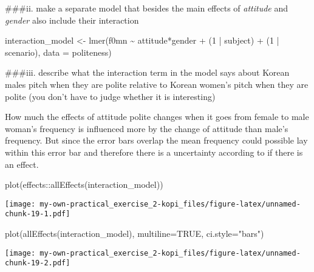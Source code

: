 \documentclass[
]{article}
\newenvironment{Shaded}{\begin{snugshade}}{\end{snugshade}}
\newcommand{\AttributeTok}[1]{\textcolor[rgb]{0.77,0.63,0.00}{#1}}
\newcommand{\ConstantTok}[1]{\textcolor[rgb]{0.00,0.00,0.00}{#1}}
\newcommand{\DecValTok}[1]{\textcolor[rgb]{0.00,0.00,0.81}{#1}}
\newcommand{\FunctionTok}[1]{\textcolor[rgb]{0.00,0.00,0.00}{#1}}
\newcommand{\NormalTok}[1]{#1}
\newcommand{\OtherTok}[1]{\textcolor[rgb]{0.56,0.35,0.01}{#1}}
\newcommand{\SpecialCharTok}[1]{\textcolor[rgb]{0.00,0.00,0.00}{#1}}
\newcommand{\StringTok}[1]{\textcolor[rgb]{0.31,0.60,0.02}{#1}}
\begin{document}
\#\#\#ii. make a separate model that besides the main effects of
\emph{attitude} and \emph{gender} also include their interaction

\begin{Shaded}
\begin{Highlighting}[]
\NormalTok{interaction\_model }\OtherTok{\textless{}{-}} \FunctionTok{lmer}\NormalTok{(f0mn }\SpecialCharTok{\textasciitilde{}}\NormalTok{ attitude}\SpecialCharTok{*}\NormalTok{gender }\SpecialCharTok{+}\NormalTok{ (}\DecValTok{1} \SpecialCharTok{|}\NormalTok{ subject) }\SpecialCharTok{+}\NormalTok{ (}\DecValTok{1} \SpecialCharTok{|}\NormalTok{ scenario), }\AttributeTok{data =}\NormalTok{ politeness)}
\end{Highlighting}
\end{Shaded}

\#\#\#iii. describe what the interaction term in the model says about
Korean males pitch when they are polite relative to Korean women's pitch
when they are polite (you don't have to judge whether it is interesting)

How much the effects of attitude polite changes when it goes from female
to male woman's frequency is influenced more by the change of attitude
than male's frequency. But since the error bars overlap the mean
frequency could possible lay within this error bar and therefore there
is a uncertainty according to if there is an effect.

\begin{Shaded}
\begin{Highlighting}[]
\FunctionTok{plot}\NormalTok{(effects}\SpecialCharTok{::}\FunctionTok{allEffects}\NormalTok{(interaction\_model))}
\end{Highlighting}
\end{Shaded}

\texttt{[image: my-own-practical\_exercise\_2-kopi\_files/figure-latex/unnamed-chunk-19-1.pdf]}

\begin{Shaded}
\begin{Highlighting}[]
\FunctionTok{plot}\NormalTok{(}\FunctionTok{allEffects}\NormalTok{(interaction\_model), }\AttributeTok{multiline=}\ConstantTok{TRUE}\NormalTok{, }\AttributeTok{ci.style=}\StringTok{"bars"}\NormalTok{)}
\end{Highlighting}
\end{Shaded}

\texttt{[image: my-own-practical\_exercise\_2-kopi\_files/figure-latex/unnamed-chunk-19-2.pdf]}
\end{document}
